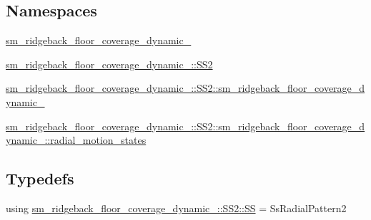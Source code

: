 \subsection*{Namespaces}
\begin{DoxyCompactItemize}
\item 
 \hyperlink{namespacesm__ridgeback__floor__coverage__dynamic__1}{sm\+\_\+ridgeback\+\_\+floor\+\_\+coverage\+\_\+dynamic\+\_}
\item 
 \hyperlink{namespacesm__ridgeback__floor__coverage__dynamic__1_1_1SS2}{sm\+\_\+ridgeback\+\_\+floor\+\_\+coverage\+\_\+dynamic\+\_\+::\+S\+S2}
\item 
 \hyperlink{namespacesm__ridgeback__floor__coverage__dynamic__1_1_1SS2_1_1sm__ridgeback__floor__coverage__dynamic__1}{sm\+\_\+ridgeback\+\_\+floor\+\_\+coverage\+\_\+dynamic\+\_\+::\+S\+S2\+::sm\+\_\+ridgeback\+\_\+floor\+\_\+coverage\+\_\+dynamic\+\_}
\item 
 \hyperlink{namespacesm__ridgeback__floor__coverage__dynamic__1_1_1SS2_1_1sm__ridgeback__floor__coverage__dyde18ae0ebb476780b9af45e701a87fab}{sm\+\_\+ridgeback\+\_\+floor\+\_\+coverage\+\_\+dynamic\+\_\+::\+S\+S2\+::sm\+\_\+ridgeback\+\_\+floor\+\_\+coverage\+\_\+dynamic\+\_\+::radial\+\_\+motion\+\_\+states}
\end{DoxyCompactItemize}
\subsection*{Typedefs}
\begin{DoxyCompactItemize}
\item 
using \hyperlink{namespacesm__ridgeback__floor__coverage__dynamic__1_1_1SS2_a4708dfdbe1e5e300cce2284bd8151560}{sm\+\_\+ridgeback\+\_\+floor\+\_\+coverage\+\_\+dynamic\+\_\+::\+S\+S2\+::\+SS} = Ss\+Radial\+Pattern2
\end{DoxyCompactItemize}
